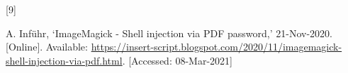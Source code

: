 \documentclass[
  11pt,
  british,
  a4paper,
]{article}
\newlength{\cslhangindent}
\newlength{\csllabelwidth}
\newenvironment{CSLReferences}[2] %
 {%
  \setlength{\parindent}{0pt}
  \ifodd #1 \everypar{\setlength{\hangindent}{\cslhangindent}}\ignorespaces\fi
  \ifnum #2 > 0
  \setlength{\parskip}{#2\baselineskip}
  \fi
 }%
 {}
\newcommand{\CSLLeftMargin}[1]{\parbox[t]{\csllabelwidth}{#1}}
\newcommand{\CSLRightInline}[1]{\parbox[t]{\linewidth - \csllabelwidth}{#1}\break}
\begin{document}
\begin{CSLReferences}{0}{0}
\leavevmode{}%
\CSLLeftMargin{{[}9{]} }
\CSLRightInline{A. Inführ, {`{ImageMagick - Shell injection via PDF
password},'} 21-Nov-2020. {[}Online{]}. Available:
\url{https://insert-script.blogspot.com/2020/11/imagemagick-shell-injection-via-pdf.html}.
{[}Accessed: 08-Mar-2021{]}}

\end{CSLReferences}
\end{document}

